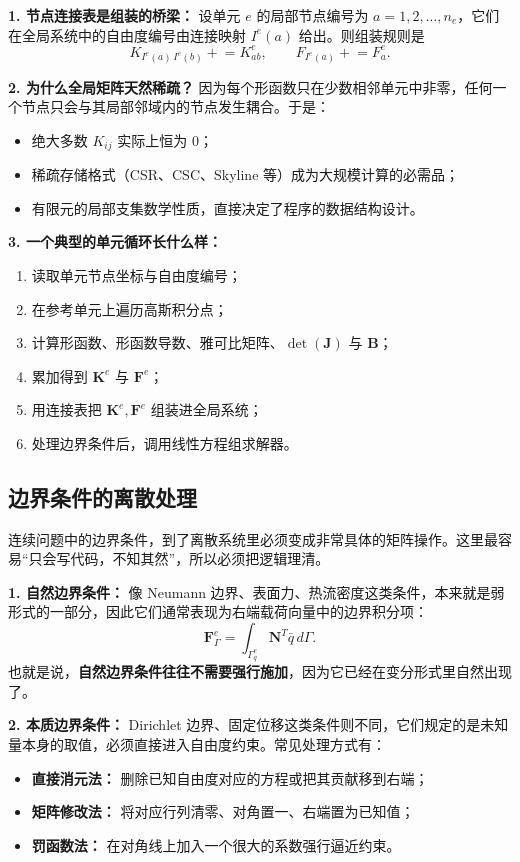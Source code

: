 \documentclass[11pt, a4paper, UTF8]{ctexart}
\begin{document}
\textbf{1. 节点连接表是组装的桥梁：}
设单元 $e$ 的局部节点编号为 $a=1,2,\dots,n_e$，它们在全局系统中的自由度编号由连接映射 $I^e(a)$ 给出。则组装规则是
\[
K_{I^e(a)\, I^e(b)} \mathrel{+}= K^e_{ab},
\qquad
F_{I^e(a)} \mathrel{+}= F^e_a.
\]

\textbf{2. 为什么全局矩阵天然稀疏？}
因为每个形函数只在少数相邻单元中非零，任何一个节点只会与其局部邻域内的节点发生耦合。于是：
\begin{itemize}
    \item 绝大多数 $K_{ij}$ 实际上恒为 0；
    \item 稀疏存储格式（CSR、CSC、Skyline 等）成为大规模计算的必需品；
    \item 有限元的局部支集数学性质，直接决定了程序的数据结构设计。
\end{itemize}

\textbf{3. 一个典型的单元循环长什么样：}
\begin{enumerate}
    \item 读取单元节点坐标与自由度编号；
    \item 在参考单元上遍历高斯积分点；
    \item 计算形函数、形函数导数、雅可比矩阵、$\det(\bm{J})$ 与 $\bm{B}$；
    \item 累加得到 $\bm{K}^e$ 与 $\bm{F}^e$；
    \item 用连接表把 $\bm{K}^e,\bm{F}^e$ 组装进全局系统；
    \item 处理边界条件后，调用线性方程组求解器。
\end{enumerate}

\subsection{边界条件的离散处理}
连续问题中的边界条件，到了离散系统里必须变成非常具体的矩阵操作。这里最容易“只会写代码，不知其然”，所以必须把逻辑理清。

\textbf{1. 自然边界条件：}
像 Neumann 边界、表面力、热流密度这类条件，本来就是弱形式的一部分，因此它们通常表现为右端载荷向量中的边界积分项：
\[
\bm{F}_{\Gamma}^e = \int_{\Gamma_q^e} \bm{N}^T \bar{q}\, d\Gamma.
\]
也就是说，\textbf{自然边界条件往往不需要强行施加}，因为它已经在变分形式里自然出现了。

\textbf{2. 本质边界条件：}
Dirichlet 边界、固定位移这类条件则不同，它们规定的是未知量本身的取值，必须直接进入自由度约束。常见处理方式有：
\begin{itemize}
    \item \textbf{直接消元法：} 删除已知自由度对应的方程或把其贡献移到右端；
    \item \textbf{矩阵修改法：} 将对应行列清零、对角置一、右端置为已知值；
    \item \textbf{罚函数法：} 在对角线上加入一个很大的系数强行逼近约束。
\end{itemize}
\end{document}
